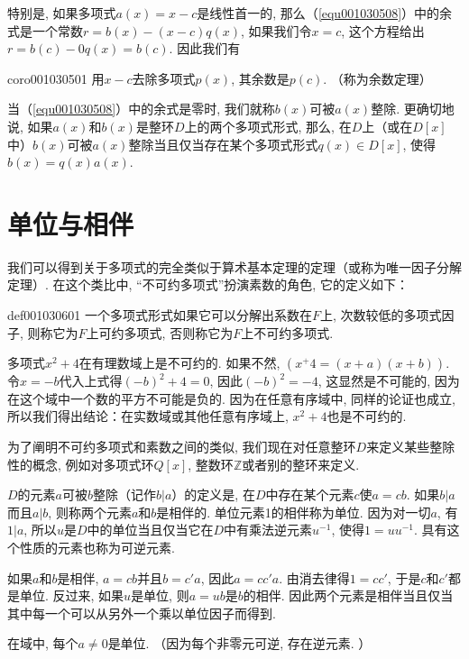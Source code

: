 特别是, 如果多项式$a(x)=x-c$是线性首一的, 那么（\ref{equ001030508}）中的余式是一个常数$r = b(x) - (x-c)q(x)$, 如果我们令$x = c$, 这个方程给出$r = b(c) - 0q(x) = b(c)$. 因此我们有
\begin{corollary}{}{coro001030501}
用$x-c$去除多项式$p(x)$, 其余数是$p(c)$. （称为余数定理）
\end{corollary}

当（\ref{equ001030508}）中的余式是零时, 我们就称$b(x)$可被$a(x)$整除. 更确切地说, 如果$a(x)$和$b(x)$是整环$D$上的两个多项式形式, 那么, 在$D$上（或在$D[x]$中）$b(x)$可被$a(x)$整除当且仅当存在某个多项式形式$q(x) \in D[x]$, 使得$b(x)=q(x)a(x)$. 


\section{单位与相伴}\label{section0010306}
我们可以得到关于多项式的完全类似于算术基本定理的定理（或称为唯一因子分解定理）. 在这个类比中, “不可约多项式”扮演素数的角色, 它的定义如下：
\begin{definition}{}{def001030601}
一个多项式形式如果它可以分解出系数在$F$上, 次数较低的多项式因子, 则称它为$F$上可约多项式, 否则称它为$F$上不可约多项式. 
\end{definition}

多项式$x^2+4$在有理数域上是不可约的. 如果不然, $(x^+4 = (x+a)(x+b))$. 令$x=-b$代入上式得$(-b)^2+4 = 0$, 因此$(-b)^2=-4$, 这显然是不可能的, 因为在这个域中一个数的平方不可能是负的. 因为在任意有序域中, 同样的论证也成立, 所以我们得出结论：在实数域或其他任意有序域上, $x^2+4$也是不可约的. 

为了阐明不可约多项式和素数之间的类似, 我们现在对任意整环$D$来定义某些整除性的概念, 例如对多项式环$Q[x]$, 整数环$\mathbb{Z}$或者别的整环来定义. 

$D$的元素$a$可被$b$整除（记作$b|a$）的定义是, 在$D$中存在某个元素$c$使$a = cb$. 如果$b|a$而且$a|b$, 则称两个元素$a$和$b$是相伴的. 单位元素1的相伴称为单位. 因为对一切$a$, 有$1|a$, 所以$u$是$D$中的单位当且仅当它在$D$中有乘法逆元素$u^{-1}$, 使得$1=uu^{-1}$. 具有这个性质的元素也称为可逆元素. 

如果$a$和$b$是相伴, $a=cb$并且$b=c'a$, 因此$a=cc'a$. 由消去律得$1=cc'$, 于是$c$和$c'$都是单位. 反过来, 如果$u$是单位, 则$a=ub$是$b$的相伴. 因此两个元素是相伴当且仅当其中每一个可以从另外一个乘以单位因子而得到. 

\begin{example}\label{exam001030601}
在域中, 每个$a \neq 0$是单位. （因为每个非零元可逆, 存在逆元素. ）
\end{example}


